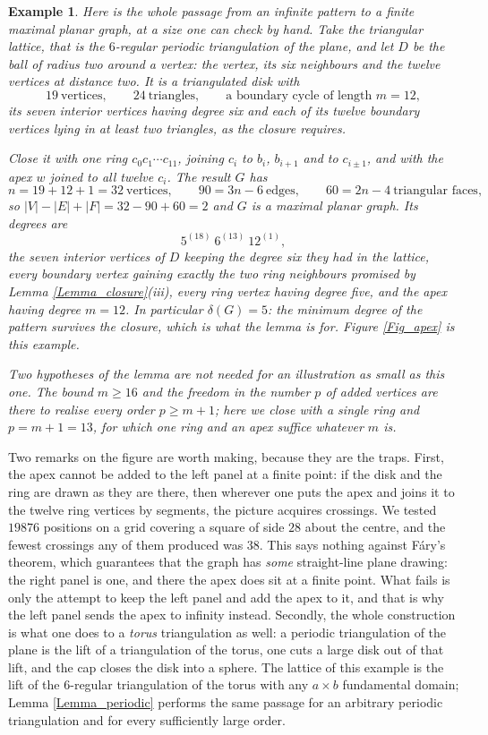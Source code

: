 \documentclass[10pt,a4paper]{article}
\newtheorem{example}[theorem]{Example}
\begin{document}
\begin{example}
\label{Ex_apex}Here is the whole passage from an infinite pattern to a finite maximal planar graph, at a
size one can check by hand. Take the triangular lattice, that is the $6$-regular periodic triangulation of the
plane, and let $D$ be the ball of radius two around a vertex: the vertex, its six neighbours and the twelve
vertices at distance two. It is a triangulated disk with
\[
19\ \text{vertices},\qquad 24\ \text{triangles},\qquad \text{a boundary cycle of length }m=12,
\]
its seven interior vertices having degree six and each of its twelve boundary vertices lying in at least two
triangles, as the closure requires.

Close it with one ring $c_{0}c_{1}\cdots c_{11}$, joining $c_{i}$ to $b_{i}$, $b_{i+1}$ and to $c_{i\pm 1}$, and
with the apex $w$ joined to all twelve $c_{i}$. The result $G$ has
\[
n=19+12+1=32\ \text{vertices},\qquad 90=3n-6\ \text{edges},\qquad 60=2n-4\ \text{triangular faces},
\]
so $|V|-|E|+|F|=32-90+60=2$ and $G$ is a maximal planar graph. Its degrees are
\[
5^{(18)}\ 6^{(13)}\ 12^{(1)} ,
\]
the seven interior vertices of $D$ keeping the degree six they had in the lattice, every boundary vertex gaining
exactly the two ring neighbours promised by Lemma \ref{Lemma_closure}(iii), every ring vertex having degree
five, and the apex having degree $m=12$. In particular $\delta (G)=5$: the minimum degree of the pattern
survives the closure, which is what the lemma is for. Figure \ref{Fig_apex} is this example.

Two hypotheses of the lemma are not needed for an illustration as small as this one. The bound $m\geq 16$ and
the freedom in the number $p$ of added vertices are there to realise \emph{every} order $p\geq m+1$; here we
close with a single ring and $p=m+1=13$, for which one ring and an apex suffice whatever $m$ is.
\end{example}

Two remarks on the figure are worth making, because they are the traps. First, the apex cannot be added
to the left panel at a finite point: if the disk and the ring are drawn as they are there, then wherever one
puts the apex and joins it to the twelve ring vertices by segments, the picture acquires crossings. We tested
$19876$ positions on a grid covering a square of side $28$ about the centre, and the fewest crossings any of
them produced was $38$. This says nothing against F\'{a}ry's theorem, which guarantees that the graph has
\emph{some} straight-line plane drawing: the right panel is one, and there the apex does sit at a finite
point. What fails is only the attempt to keep the left panel and add the apex to it, and that is why the left
panel sends the apex to infinity instead. Secondly, the whole construction is what one does to a \emph{torus}
triangulation as well: a periodic triangulation of the plane is the lift of a triangulation of the torus, one
cuts a large disk out of that lift, and the cap closes the disk into a sphere. The lattice of this example is
the lift of the $6$-regular triangulation of the torus with any $a\times b$ fundamental domain; Lemma
\ref{Lemma_periodic} performs the same passage for an arbitrary periodic triangulation and for every
sufficiently large order.
\end{document}
